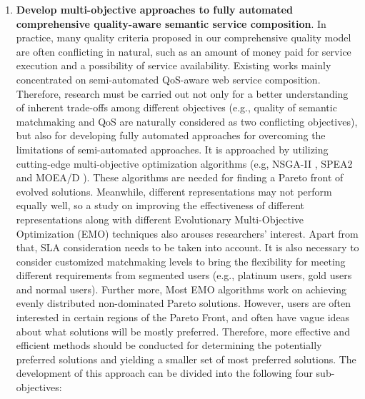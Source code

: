 \begin{enumerate}
 \item \label{Obj:2} \textbf{Develop multi-objective approaches to fully automated comprehensive quality-aware semantic service composition}. In practice, many quality criteria proposed in our comprehensive quality model are often conflicting in natural, such as an amount of money paid for service execution and a possibility of service availability. Existing works \cite{chen2014partial,xiang2014qos,yin2014hybrid,liu2005dynamic,yu2013efficient,zhang2010qos} mainly concentrated on semi-automated QoS-aware web service composition. Therefore, research must be carried out not only for a better understanding of inherent trade-offs among different objectives (e.g., quality of semantic matchmaking and QoS are naturally considered as two conflicting objectives), but also for developing fully automated approaches for overcoming the limitations of semi-automated approaches. It is approached by utilizing cutting-edge multi-objective optimization algorithms (e.g, NSGA-II \cite{deb2002fast}, SPEA2 \cite{zitzler2001spea2} and MOEA/D \cite{zhang2007moea}). These algorithms are needed for finding a Pareto front of evolved solutions. Meanwhile, different representations may not perform equally well, so a study on improving the effectiveness of different representations along with different Evolutionary Multi-Objective Optimization (EMO) techniques also arouses researchers' interest. Apart from that, SLA consideration needs to be taken into account. It is also necessary to consider customized matchmaking levels to bring the flexibility for meeting different requirements from segmented users (e.g., platinum users, gold users and normal users). Further more, Most EMO algorithms work on achieving evenly distributed non-dominated Pareto solutions. However, users are often interested in certain regions of the Pareto Front, and often have vague ideas about what solutions will be mostly preferred. Therefore, more effective and efficient methods should be conducted for determining the potentially preferred solutions and yielding a smaller set of most preferred solutions. The development of this approach can be divided into the following four sub-objectives:
   \begin{enumerate}
   

\end{enumerate}
\end{enumerate}
